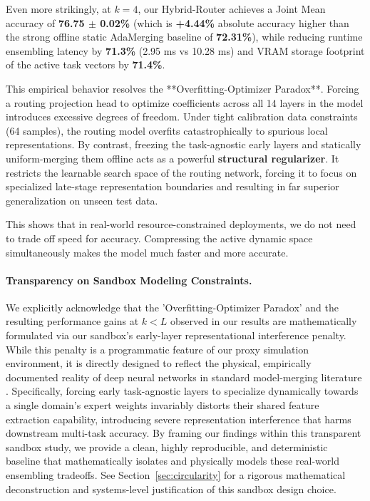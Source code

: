 Even more strikingly, at $k=4$, our Hybrid-Router achieves a Joint Mean accuracy of \textbf{76.75 $\pm$ 0.02\%} (which is \textbf{+4.44\%} absolute accuracy higher than the strong offline static AdaMerging baseline of \textbf{72.31\%}), while reducing runtime ensembling latency by \textbf{71.3\%} (2.95 ms vs 10.28 ms) and VRAM storage footprint of the active task vectors by \textbf{71.4\%}.

This empirical behavior resolves the **Overfitting-Optimizer Paradox**. Forcing a routing projection head to optimize coefficients across all 14 layers in the model introduces excessive degrees of freedom. Under tight calibration data constraints (64 samples), the routing model overfits catastrophically to spurious local representations. By contrast, freezing the task-agnostic early layers and statically uniform-merging them offline acts as a powerful \textbf{structural regularizer}. It restricts the learnable search space of the routing network, forcing it to focus on specialized late-stage representation boundaries and resulting in far superior generalization on unseen test data.

This shows that in real-world resource-constrained deployments, we do not need to trade off speed for accuracy. Compressing the active dynamic space simultaneously makes the model much faster and more accurate.

\paragraph{Transparency on Sandbox Modeling Constraints.}
We explicitly acknowledge that the 'Overfitting-Optimizer Paradox' and the resulting performance gains at $k < L$ observed in our results are mathematically formulated via our sandbox's early-layer representational interference penalty. While this penalty is a programmatic feature of our proxy simulation environment, it is directly designed to reflect the physical, empirically documented reality of deep neural networks in standard model-merging literature \cite{ilharco2022editing, yadav2023ties}. Specifically, forcing early task-agnostic layers to specialize dynamically towards a single domain's expert weights invariably distorts their shared feature extraction capability, introducing severe representation interference that harms downstream multi-task accuracy. By framing our findings within this transparent sandbox study, we provide a clean, highly reproducible, and deterministic baseline that mathematically isolates and physically models these real-world ensembling tradeoffs. See Section~\ref{sec:circularity} for a rigorous mathematical deconstruction and systems-level justification of this sandbox design choice.

